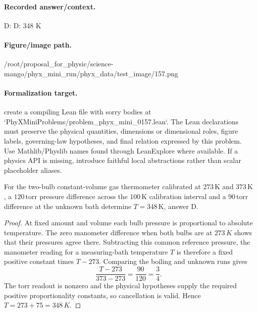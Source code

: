 \paragraph{Recorded answer/context.}
D: D: 348 K

\paragraph{Figure/image path.}
/root/proposal\_for\_physic/science-mango/phyx\_mini\_run/phyx\_data/test\_image/157.png

\paragraph{Formalization target.}
create a compiling Lean file with sorry bodies at `PhyXMiniProblems/problem\_phyx\_mini\_0157.lean`. The Lean declarations must preserve the physical quantities, dimensions or dimensional roles, figure labels, governing-law hypotheses, and final relation expressed by this problem.
Use Mathlib/Physlib names found through LeanExplore where available. If a physics API is missing, introduce faithful local abstractions rather than scalar placeholder aliases.

\begin{theorem}
\label{thm:physics:phyx_mini_0157:target}
For the two-bulb constant-volume gas thermometer calibrated at \(273\,\mathrm K\)
and \(373\,\mathrm K\), a \(120\,\mathrm{torr}\) pressure difference across
the \(100\,\mathrm K\) calibration interval and a \(90\,\mathrm{torr}\)
difference at the unknown bath determine \(T=348\,\mathrm K\), answer D.
\end{theorem}
\begin{proof}
At fixed amount and volume each bulb pressure is proportional to absolute
temperature.  The zero manometer difference when both bulbs are at \(273\,K\)
shows that their pressures agree there.  Subtracting this common reference
pressure, the manometer reading for a measuring-bath temperature \(T\) is
therefore a fixed positive constant times \(T-273\).  Comparing the boiling
and unknown runs gives
\[
 \frac{T-273}{373-273}=\frac{90}{120}=\frac34.
\]
The torr readout is nonzero and the physical hypotheses supply the required
positive proportionality constants, so cancellation is valid.  Hence
\(T=273+75=348\,K\).
\end{proof}

